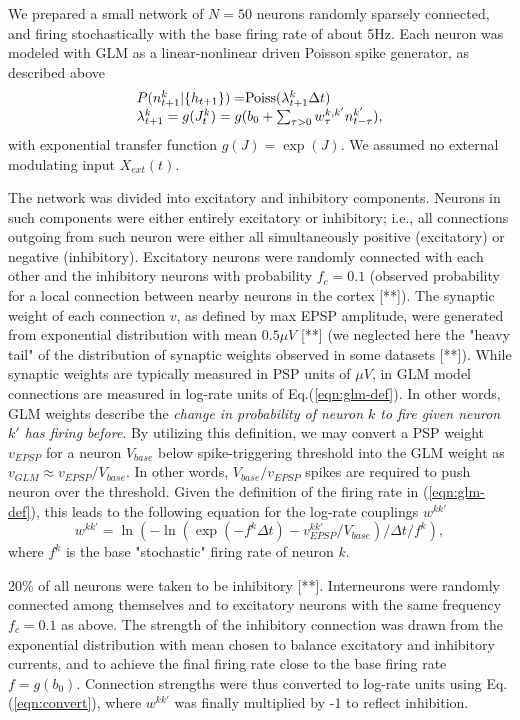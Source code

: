 \documentclass[amsmath,amssymb]{revtex4}
\begin{document}
We prepared a small network of $N=50$  neurons randomly sparsely connected, and firing stochastically with the base firing rate of about 5Hz. Each neuron was modeled with GLM as a linear-nonlinear driven Poisson spike generator, as described above
\begin{equation}\label{eqn:glm-def}
\begin{array}{l}
P(n^k_{t+1}|\{h_{t+1}\})=$Poiss$(\lambda^k_{t+1}\Delta t) \\
\lambda^k_{t+1}=g(J^k_t)=g(b_0+\sum_{\tau>0}w^{k,k'}_{\tau}n^{k'}_{t-\tau}),
\end{array}
\end{equation}
with exponential transfer function $g(J)=\exp(J)$. We assumed no external modulating input $X_{ext}(t)$.

The network was divided into excitatory and inhibitory components.
Neurons in such components were either entirely excitatory or inhibitory; i.e., all connections outgoing from such neuron were either all simultaneously positive (excitatory) or negative (inhibitory). Excitatory neurons were randomly connected with each other and the inhibitory neurons with probability $f_c=0.1$ (observed probability for a local connection between nearby neurons in the cortex [**]). The synaptic weight of each connection $v$, as defined by max EPSP amplitude, were generated from exponential distribution with mean $0.5 \mu V$ [**] (we neglected here the "heavy tail" of the distribution of synaptic weights observed in some datasets [**]).
While synaptic weights are typically measured in PSP units of $\mu V$,
in GLM model connections are measured in log-rate units of Eq.(\ref{eqn:glm-def}).
In other words, GLM weights describe the {\em change in probability of neuron $k$
to fire given neuron $k'$ has firing before}.
By utilizing this definition, we may convert a PSP weight $v_{EPSP}$ for a neuron $V_{base}$ below spike-triggering threshold into the GLM weight as $v_{GLM}\approx v_{EPSP}/V_{base}$. In other words, $V_{base}/v_{EPSP}$ spikes are required to push neuron over the threshold. Given the definition of the firing rate in (\ref{eqn:glm-def}), this
leads to the following equation for the log-rate couplings $w^{kk'}$
\begin{equation}\label{eqn:convert}
w^{kk'}=\ln(-\ln(\exp(-f^k \Delta t)-v^{kk'}_{EPSP}/V_{base})/\Delta t/f^k),
\end{equation}
where $f^k$ is the base "stochastic" firing rate of neuron $k$.

20\% of all neurons were taken to be inhibitory [**]. Interneurons were randomly connected among themselves and to excitatory neurons with the same frequency $f_c=0.1$ as above. The strength of the inhibitory connection was drawn from the exponential distribution with mean chosen to balance excitatory and inhibitory currents, and to achieve the final firing rate close to the base firing rate $f=g(b_0)$. Connection strengths were thus converted to log-rate units using Eq.(\ref{eqn:convert}), where $w^{kk'}$ was finally multiplied by -1 to reflect inhibition.
\end{document}
